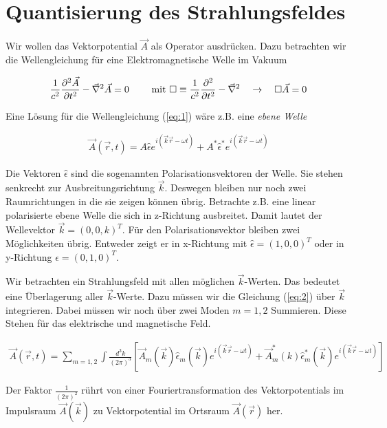 
\usepackage{amsmath}                %
\usepackage{amsfonts}




\section*{Quantisierung des Strahlungsfeldes}

Wir wollen das Vektorpotential \(\vec A\) als Operator ausdrücken. Dazu betrachten wir die Wellengleichung für eine Elektromagnetische Welle im Vakuum

\begin{align}
  \label{eq:1}
  \frac{1}{c^2}\pdiff^2{\vec A}_t - \vec \nabla^2\vec A = 0 \qquad \text{ mit }\square\equiv\frac{1}{c^2}\pdiff^2_t - \vec \nabla^2\quad\to\quad\square\vec A = 0
\end{align}

Eine Lösung für die Wellengleichung (\ref{eq:1}) wäre z.B. eine \textit{ebene Welle}

\begin{align}
  \label{eq:2}
  \vec A(\vec r, t) = A\hat \epsilon e^{i(\vec k\vec r -\omega t)} + A^*\hat \epsilon^* e^{i(\vec k\vec r-\omega t)} 
\end{align}

Die Vektoren \(\hat \epsilon\) sind die sogenannten Polarisationsvektoren der Welle. Sie stehen senkrecht zur Ausbreitungsrichtung \(\vec k\). Deswegen bleiben nur noch zwei Raumrichtungen in die sie zeigen können übrig. Betrachte z.B. eine linear polarisierte ebene Welle die sich in z-Richtung ausbreitet. Damit lautet der Wellevektor \(\vec k = (0,0,k)^T\). Für den Polarisationsvektor bleiben zwei Möglichkeiten übrig. Entweder zeigt er in x-Richtung mit \(\hat \epsilon=(1,0,0)^T\) oder in y-Richtung \(\hat \epsilon=(0,1,0)^T\).

Wir betrachten ein Strahlungsfeld mit allen möglichen \(\vec k\)-Werten. Das bedeutet eine Überlagerung aller \(\vec k\)-Werte. Dazu müssen wir die Gleichung (\ref{eq:2}) über \(\vec k\) integrieren. Dabei müssen wir noch über zwei Moden \(m=1,2\) Summieren. Diese Stehen für das elektrische und magnetische Feld.

\begin{align}
  \label{eq:3}
\vec A(\vec r, t) =\sum_{m=1,2}\int\frac{d^3k}{(2\pi)^3} \left[  \vec A_m (\vec k) \hat \epsilon_m (\vec k) e^{i(\vec k\vec r-\omega t)} + \vec A^*_m (k)\hat\epsilon^*_m(\vec k) e^{i(\vec k\vec r-\omega t)}\right]
\end{align}

Der Faktor \(\frac{1}{(2\pi)^2}\) rührt von einer Fouriertransformation des Vektorpotentials im Impulsraum \(\vec A(\vec k)\) zu Vektorpotential im Ortsraum \(\vec A(\vec r)\) her.




